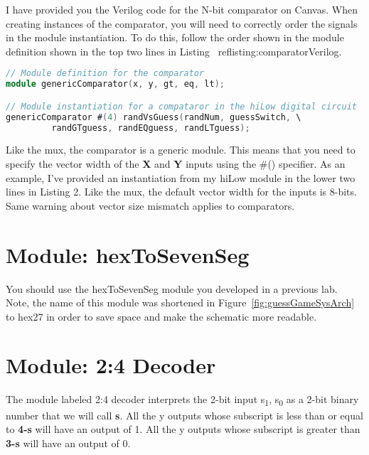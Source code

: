 I have provided you the Verilog code for the N-bit comparator on Canvas.
When creating instances of the comparator, you will need to correctly
order the signals in the module instantiation. To do this, follow the
order shown in the module definition shown in the top two lines in
Listing ~ref{listing:comparatorVerilog}.

\begin{lstlisting}[language=Verilog,
 caption={Top, the module definition for the comparator.  Bottom, module
 instantiation of a comparator in Figure~\ref{fig:comparatorSymbol}.},
 label={listing:comparatorVerilog},
 frame=single]
// Module definition for the comparator
module genericComparator(x, y, gt, eq, lt);

// Module instantiation for a compataror in the hiLow digital circuit
genericComparator #(4) randVsGuess(randNum, guessSwitch, \
		 randGTguess, randEQguess, randLTguess);
\end{lstlisting}

Like the mux, the comparator is a generic module. This means that you
need to specify the vector width of the \textbf{X} and \textbf{Y} inputs
using the \#() specifier. As an example, I've provided an instantiation
from my hiLow module in the lower two lines in Listing 2. Like the mux,
the default vector width for the inputs is 8-bits. Same warning about
vector size mismatch applies to comparators.

\hypertarget{hextosevenseg-module}{%
\section{Module: hexToSevenSeg}
\label{hextosevenseg-module}}
You should use the hexToSevenSeg module you developed in a
previous lab. Note, the name of this module was shortened in Figure~\ref{fig:guessGameSysArch}
to
hex27 in order to save space and make the schematic more
readable.

\hypertarget{decoder-module}{%
\section{Module: 2:4 Decoder}
\label{decoder-module}}

The module labeled 2:4 decoder interprets the 2-bit input
s\textsubscript{1}, s\textsubscript{0} as a 2-bit binary number that we
will call \textbf{s}. All the y outputs whose subscript is less than or
equal to \textbf{4-s} will have an output of 1. All the y outputs whose
subscript is greater than \textbf{3-s} will have an output of 0.

